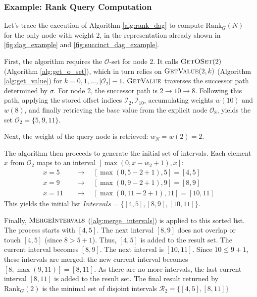 \subsubsection*{Example: Rank Query Computation \label{subsubsec:rank_query_example_node2}}

Let's trace the execution of Algorithm \ref{alg:rank_dag} to compute $\mathrm{Rank}_G(N)$ for the only node with weight $2$, in the representation already shown in \autoref{fig:dag_example} and \autoref{fig:succinct_dag_example}.

First, the algorithm requires the $\mathcal{O}$-set for node 2. It calls $\textsc{GetOSet}(2)$ (Algorithm \ref{alg:get_o_set}), which in turn relies on $\textsc{GetValue}(2, k)$ (Algorithm \ref{alg:get_value}) for $k=0, 1, \dots, |\mathcal{O}_2|-1$. $\textsc{GetValue}$ traverses the successor path determined by $\sigma$. For node 2, the successor path is $2 \to 10 \to 8$. Following this path, applying the stored offset indices $\mathcal{I}_2, \mathcal{I}_{10}$, accumulating weights $w(10)$ and $w(8)$, and finally retrieving the base value from the explicit node $\mathcal{O}_8$, yields the set $\mathcal{O}_2 = \{5, 9, 11\}$.

Next, the weight of the query node is retrieved: $w_N = w(2) = 2$.

The algorithm then proceeds to generate the initial set of intervals. Each element $x$ from $\mathcal{O}_2$ maps to an interval $[\max(0, x - w_2 + 1), x]$:
\begin{align*}
    x=5 \quad  & \longrightarrow \quad [\max(0, 5 - 2 + 1), 5] = [4, 5]     \\
    x=9 \quad  & \longrightarrow \quad [\max(0, 9 - 2 + 1), 9] = [8, 9]     \\
    x=11 \quad & \longrightarrow \quad [\max(0, 11 - 2 + 1), 11] = [10, 11]
\end{align*}
This yields the initial list $Intervals = \{ [4, 5], [8, 9], [10, 11] \}$.

Finally, $\textsc{MergeIntervals}$ (\ref{alg:merge_intervals}) is applied to this sorted list.
The process starts with $[4, 5]$. The next interval $[8, 9]$ does not overlap or touch $[4, 5]$ (since $8 > 5+1$). Thus, $[4, 5]$ is added to the result set.
The current interval becomes $[8, 9]$. The next interval is $[10, 11]$. Since $10 \le 9 + 1$, these intervals are merged: the new current interval becomes $[8, \max(9, 11)] = [8, 11]$.
As there are no more intervals, the last current interval $[8, 11]$ is added to the result set. The final result returned by $\mathrm{Rank}_G(2)$ is the minimal set of disjoint intervals $\mathcal{R}_2 = \{ [4, 5], [8, 11] \}$
